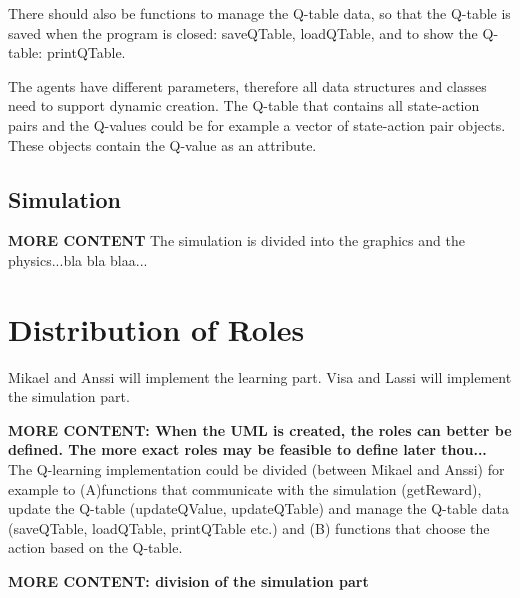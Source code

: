 \documentclass{article}
\begin{document}
There should also be functions to manage the Q-table data, so that the Q-table is
saved when the program is closed: saveQTable, loadQTable, and to show the Q-table:
printQTable.

The agents have different parameters, therefore all data structures and classes
need to support dynamic creation. The Q-table that contains all state-action pairs
and the Q-values could be for example a vector of state-action pair objects. These
objects contain the Q-value as an attribute.


\subsection{Simulation}
\textbf{MORE CONTENT}
The simulation is divided into the graphics and the physics...bla bla blaa...



\section{Distribution of Roles}
Mikael and Anssi will implement the learning part.
Visa and Lassi will implement the simulation part.

\textbf{MORE CONTENT: When the UML is created, the roles can better be defined.
  The more exact roles may be feasible to define later thou...}
The Q-learning implementation could be divided (between Mikael and Anssi) for
example to (A)functions that communicate with the simulation (getReward), update
the Q-table (updateQValue, updateQTable) and manage the Q-table data (saveQTable,
loadQTable, printQTable etc.) and (B) functions that choose the action based on
the Q-table.

\textbf{MORE CONTENT: division of the simulation part}
\end{document}
